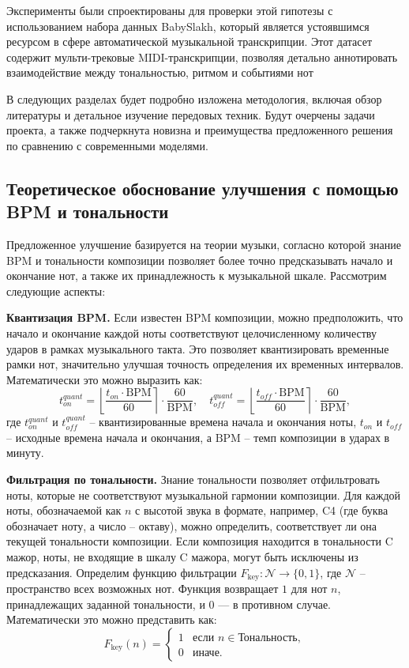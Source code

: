 \documentclass[a4paper, 12pt]{article} %
\begin{document}
Эксперименты были спроектированы для проверки этой гипотезы с использованием набора данных BabySlakh, который является устоявшимся ресурсом в сфере автоматической музыкальной транскрипции. Этот датасет содержит мульти-трековые MIDI-транскрипции, позволяя детально аннотировать взаимодействие между тональностью, ритмом и событиями нот

В следующих разделах будет подробно изложена методология, включая обзор литературы и детальное изучение передовых техник. Будут очерчены задачи проекта, а также подчеркнута новизна и преимущества предложенного решения по сравнению с современными моделями.

\subsection{Теоретическое обоснование улучшения с помощью BPM и тональности}

Предложенное улучшение базируется на теории музыки, согласно которой знание BPM и тональности композиции позволяет более точно предсказывать начало и окончание нот, а также их принадлежность к музыкальной шкале. Рассмотрим следующие аспекты:

\textbf{Квантизация BPM.} Если известен BPM композиции, можно предположить, что начало и окончание каждой ноты соответствуют целочисленному количеству ударов в рамках музыкального такта. Это позволяет квантизировать временные рамки нот, значительно улучшая точность определения их временных интервалов. Математически это можно выразить как:
\[
t_{on}^{quant} = \left\lfloor\frac{t_{on} \cdot \text{BPM}}{60}\right\rceil \cdot \frac{60}{\text{BPM}}, \quad t_{off}^{quant} = \left\lfloor\frac{t_{off} \cdot \text{BPM}}{60}\right\rceil \cdot \frac{60}{\text{BPM}},
\]
где $t_{on}^{quant}$ и $t_{off}^{quant}$ -- квантизированные времена начала и окончания ноты, $t_{on}$ и $t_{off}$ -- исходные времена начала и окончания, а $\text{BPM}$ -- темп композиции в ударах в минуту.

\textbf{Фильтрация по тональности.} Знание тональности позволяет отфильтровать ноты, которые не соответствуют музыкальной гармонии композиции. Для каждой ноты, обозначаемой как $n$ с высотой звука в формате, например, C4 (где буква обозначает ноту, а число -- октаву), можно определить, соответствует ли она текущей тональности композиции. Если композиция находится в тональности C мажор, ноты, не входящие в шкалу C мажора, могут быть исключены из предсказания. Определим функцию фильтрации $F_{\text{key}}: \mathcal{N} \rightarrow \{0, 1\}$, где $\mathcal{N}$ -- пространство всех возможных нот. Функция возвращает $1$ для нот $n$, принадлежащих заданной тональности, и $0$ --- в противном случае. Математически это можно представить как:
\[
F_{\text{key}}(n) = 
\begin{cases} 
1 & \text{если } n \in \text{Тональность}, \\
0 & \text{иначе}.
\end{cases}
\]
\end{document}
